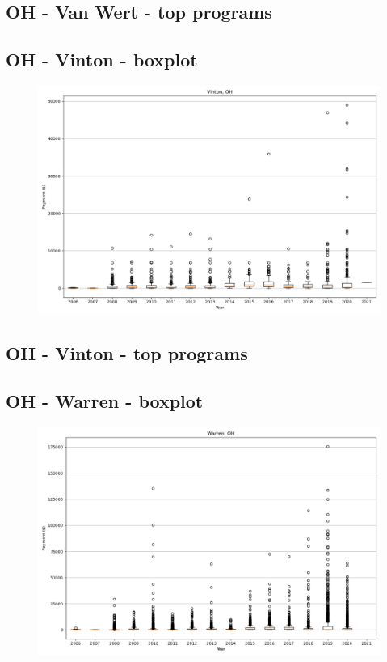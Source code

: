 \subsection*{OH - Van Wert - top programs}

\newpage
\subsection*{OH - Vinton - boxplot}
\begin{figure}[h]
\centering
\includegraphics[width=7in]{../output/boxplots/counties/Vinton-OH_boxplot.png}
\end{figure}


\subsection*{OH - Vinton - top programs}

\newpage
\subsection*{OH - Warren - boxplot}
\begin{figure}[h]
\centering
\includegraphics[width=7in]{../output/boxplots/counties/Warren-OH_boxplot.png}
\end{figure}


